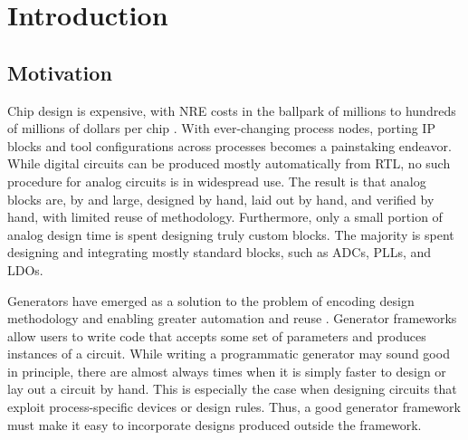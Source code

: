 \chapter{Introduction}

\section{Motivation}

Chip design is expensive, with NRE costs in the ballpark of millions to
hundreds of millions of dollars per chip \cite{horowitz}.
With ever-changing process nodes, porting IP blocks and tool configurations
across processes becomes a painstaking endeavor.
While digital circuits can be produced mostly automatically from RTL,
no such procedure for analog circuits is in widespread use.
The result is that analog blocks are, by and large, designed by hand,
laid out by hand, and verified by hand, with limited reuse of methodology.
Furthermore, only a small portion of analog design time is spent designing
truly custom blocks. The majority is spent designing and integrating
mostly standard blocks, such as ADCs, PLLs, and LDOs.

Generators have emerged as a solution to the problem of encoding design
methodology and enabling greater automation and reuse \cite{align, template-driven-analog}.
Generator frameworks allow users to write code that accepts some set of parameters
and produces instances of a circuit. While writing a programmatic generator
may sound good in principle, there are almost always times when it is simply
faster to design or lay out a circuit by hand. This is especially the case
when designing circuits that exploit process-specific devices or design rules.
Thus, a good generator framework must make it easy to incorporate designs
produced outside the framework.

